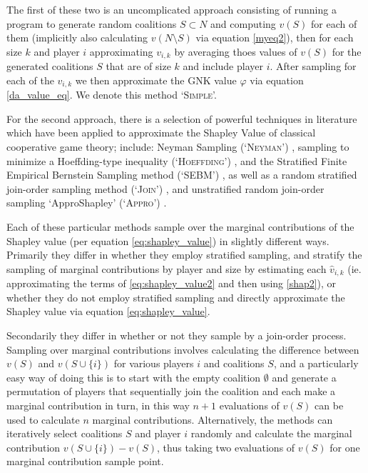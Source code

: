 The first of these two is an uncomplicated approach consisting of running a program to generate random coalitions $S\subset N$ and computing $v(S)$ for each of them (implicitly also calculating $v(N\setminus S)$ via equation \ref{myeq2}), then for each size $k$ and player $i$ approximating $v_{i,k}$ by averaging thoes values of $v(S)$ for the generated coalitions $S$ that are of size $k$ and include player $i$.
After sampling for each of the $v_{i,k}$ we then approximate the GNK value $\varphi$ via equation \ref{da_value_eq}. We denote this method `\textsc{Simple}'.

For the second approach, there is a selection of powerful techniques in literature which have been applied to approximate the Shapley Value of classical cooperative game theory; include: Neyman Sampling (`\textsc{Neyman}') \cite{CASTRO2017180,1938.10503378}, sampling to minimize a Hoeffding-type inequality (`\textsc{Hoeffding}') \cite{2013arXiv1306.4265M}, and the Stratified Finite Empirical Bernstein Sampling method (`SEBM') \cite{burgess2}, as well as a random stratified join-order sampling method (`\textsc{Join}') \cite{CASTRO2017180}, and unstratified random join-order sampling `ApproShapley' (`\textsc{Appro}') \cite{DBLP:journals/cor/CastroGT09}.

Each of these particular methods sample over the marginal contributions of the Shapley value (per equation \ref{eq:shapley_value}) in slightly different ways.
Primarily they differ in whether they employ stratified sampling, and stratify the sampling of marginal contributions by player and size by estimating each $\hat{v}_{i,k}$ (ie. approximating the terms of \eqref{eq:shapley_value2} and then using \eqref{shap2}), or whether they do not employ stratified sampling and directly approximate the Shapley value via equation \eqref{eq:shapley_value}.

Secondarily they differ in whether or not they sample by a join-order process. Sampling over marginal contributions involves calculating the difference between $v(S)$ and $v(S\cup\{i\})$ for various players $i$ and coalitions $S$, and a particularly easy way of doing this is to start with the empty coalition $\emptyset$ and generate a permutation of players that sequentially join the coalition and each make a marginal contribution in turn, in this way $n+1$ evaluations of $v(S)$ can be used to calculate $n$ marginal contributions. Alternatively, the methods can iteratively select coalitions $S$ and player $i$ randomly and calculate the marginal contribution $v(S\cup\{i\}) - v(S)$, thus taking two evaluations of $v(S)$ for one marginal contribution sample point.

